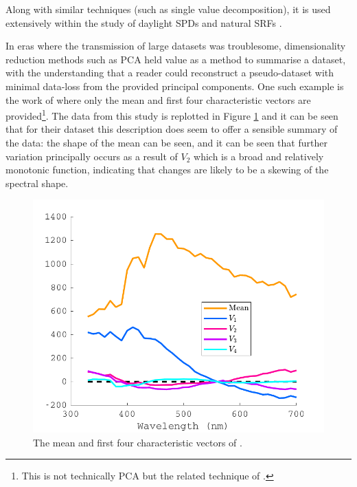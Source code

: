 Along with similar techniques (such as single value decomposition), it is used extensively within the study of daylight \glspl{SPD} \citep{hernandez-andres_color_2001,ojeda_influence_2012,pant_estimating_2009,bui_group_2004,judd_spectral_1964,maloney_computational_1984,spitschan_variation_2016} and natural \glspl{SRF} \citep{maloney_computational_1984,dzmura_color_1992,maloney_evaluation_1986,maloney_color_1986,cohen_dependency_1964,ferrero_principal_2011,zhang_reconstructing_2008,kwon_surface_2007,agahian_reconstruction_2008,harifi_recovery_2008,parkkinen_characteristic_1989,vrhel_color_1992,fairman_principal_2004,ayala_use_2006,eem_reconstruction_1994-2,connah_multispectral_2006,shi_using_2002,morovic_metamer-set-based_2006}. 


In eras where the transmission of large datasets was troublesome, dimensionality reduction methods such as \gls{PCA} held value as a method to summarise a dataset, with the understanding that a reader could reconstruct a pseudo-dataset with minimal data-loss from the provided principal components. One such example is the work of \citet{judd_spectral_1964} where only the mean and first four characteristic vectors are provided\footnote{This is not technically \gls{PCA} but the related technique of \citet{morris_objective_1954}.}. The data from this study is replotted in Figure \ref{fig:Judd} and it can be seen that for their dataset this description does seem to offer a sensible summary of the data: the shape of the mean can be seen, and it can be seen that further variation principally occurs as a result of $V_{2}$ which is a broad and relatively monotonic function, indicating that changes are likely to be a skewing of the spectral shape.

\begin{figure}[htbp]
 \includegraphics[max width=\textwidth]{figs/LitRev/Judd.pdf}
 \caption{The mean and first four characteristic vectors of \citet{judd_spectral_1964}.}
 \label{fig:Judd}
\end{figure} 

\clearpage
